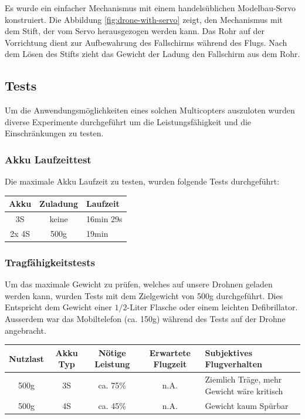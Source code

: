 Es wurde ein einfacher Mechanismus mit einem handelsüblichen Modelbau-Servo konstruiert. Die Abbildung \ref{fig:drone-with-servo} zeigt, den Mechanismus mit dem Stift, der vom Servo herausgezogen werden kann. Das Rohr auf der Vorrichtung dient zur Aufbewahrung des Fallschirms während des Flugs. Nach dem Lösen des Stifts zieht das Gewicht der Ladung den Fallschirm aus dem Rohr.\\

\subsection{Tests}
Um die Anwendungsmöglichkeiten eines solchen Multicopters auszuloten wurden diverse Experimente durchgeführt um die Leistungsfähigkeit und die Einschränkungen zu testen.

\subsubsection{Akku Laufzeittest}
Die maximale Akku Laufzeit zu testen, wurden folgende Tests durchgeführt: \\

\begin{tabularx}{\textwidth}{|c|c|X|}
	\hline
	\textbf{Akku} & \textbf{Zuladung} & \textbf{Laufzeit} \\ \hline \hline
	3S & keine & 16min 29s\\ \hline
	2x 4S & 500g & 19min\\ \hline
\end{tabularx}

\subsubsection{Tragfähigkeitstests}
\label{sec:drone-gewichttest}

Um das maximale Gewicht zu prüfen, welches auf unsere Drohnen geladen werden kann, wurden Tests mit dem Zielgewicht von 500g durchgeführt. Dies Entspricht dem Gewicht einer $1/2$-Liter Flasche oder einem leichten Defibrillator. Ausserdem war das Mobiltelefon (ca. 150g) während des Tests auf der Drohne angebracht.  \\

\begin{tabularx}{\textwidth}{|c|c|c|c|X|}
	\hline
	\textbf{Nutzlast} & \textbf{Akku Typ} & \textbf{Nötige Leistung }& \textbf{Erwartete Flugzeit } & \textbf{Subjektives Flugverhalten }\\
	\hline \hline
	500g & 3S & ca. 75\%  & n.A. & Ziemlich Träge, mehr Gewicht wäre kritisch\\\hline
	500g & 4S & ca. 45\%  & n.A. & Gewicht kaum Spürbar\\
	\hline
\end{tabularx}\\

